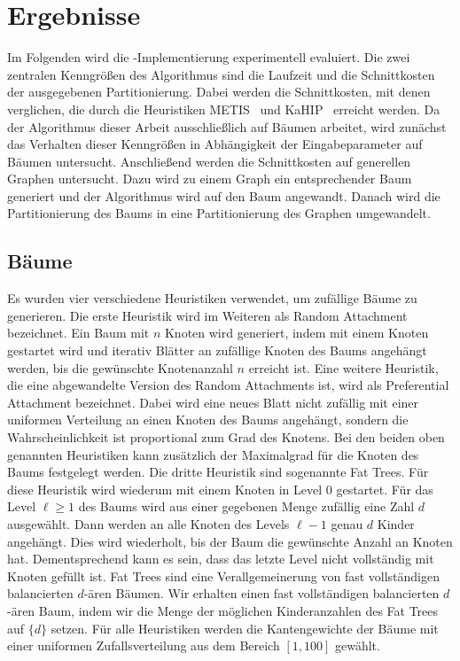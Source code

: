 \chapter{Ergebnisse}\label{chapter:ergebnisse}
Im Folgenden wird die \Cpp\hyp Implementierung experimentell evaluiert.
Die zwei zentralen Kenngrößen des Algorithmus sind die Laufzeit und die Schnittkosten der ausgegebenen Partitionierung.
Dabei werden die Schnittkosten, mit denen verglichen, die durch die Heuristiken METIS~\cite{KK98} und KaHIP~\cite{SS13} erreicht werden.
Da der Algorithmus dieser Arbeit ausschließlich auf Bäumen arbeitet, wird zunächst das Verhalten dieser Kenngrößen in Abhängigkeit der Eingabeparameter auf Bäumen untersucht.
Anschließend werden die Schnittkosten auf generellen Graphen untersucht.
Dazu wird zu einem Graph ein entsprechender Baum generiert und der Algorithmus wird auf den Baum angewandt.
Danach wird die Partitionierung des Baums in eine Partitionierung des Graphen umgewandelt.

\section{Bäume}
Es wurden vier verschiedene Heuristiken verwendet, um zufällige Bäume zu generieren.
Die erste Heuristik wird im Weiteren als Random Attachment bezeichnet. 
Ein Baum mit $n$ Knoten wird generiert, indem mit einem Knoten gestartet wird und iterativ Blätter an zufällige Knoten des Baums angehängt werden, bis die gewünschte Knotenanzahl $n$ erreicht ist.
Eine weitere Heuristik, die eine abgewandelte Version des Random Attachments ist, wird als Preferential Attachment bezeichnet.
Dabei wird eine neues Blatt nicht zufällig mit einer uniformen Verteilung an einen Knoten des Baums angehängt, sondern die Wahrscheinlichkeit ist proportional zum Grad des Knotens.
Bei den beiden oben genannten Heuristiken kann zusätzlich der Maximalgrad für die Knoten des Baums festgelegt werden.
Die dritte Heuristik sind sogenannte Fat Trees.
Für diese Heuristik wird wiederum mit einem Knoten in Level $0$ gestartet.
Für das Level $\ell \geq 1$ des Baums wird aus einer gegebenen Menge zufällig eine Zahl $d$ ausgewählt.
Dann werden an alle Knoten des Levels $\ell - 1$ genau $d$ Kinder angehängt.
Dies wird wiederholt, bis der Baum die gewünschte Anzahl an Knoten hat. 
Dementsprechend kann es sein, dass das letzte Level nicht vollständig mit Knoten gefüllt ist.
Fat Trees sind eine Verallgemeinerung von fast vollständigen balancierten $d$\hyp ären Bäumen.
Wir erhalten einen fast vollständigen balancierten $d$\hyp ären Baum, indem wir die Menge der möglichen Kinderanzahlen des Fat Trees auf $\{d\}$ setzen.
Für alle Heuristiken werden die Kantengewichte der Bäume mit einer uniformen Zufallsverteilung aus dem Bereich $[1, 100]$ gewählt.

